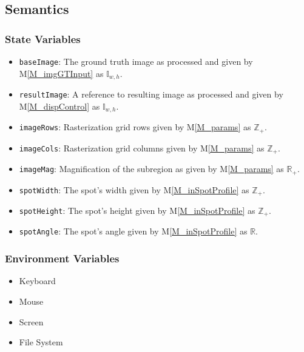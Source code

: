 \documentclass[12pt, titlepage]{article}
\newcommand{\mref}[1]{M\ref{#1}}
\newcommand{\code}[1]{\texttt{#1}}
\begin{document}
\subsection{Semantics}

\subsubsection{State Variables}
\begin{itemize}
  \item \code{baseImage}: The ground truth image as processed and given by \mref{M_imgGTInput} as $\mathbb{I}_{w,h}$.
  \item \code{resultImage}: A reference to resulting image as processed and given by \mref{M_dispControl} as $\mathbb{I}_{w,h}$.
  \item \code{imageRows}: Rasterization grid rows given by \mref{M_params} as $\mathbb{Z}_+$.
  \item \code{imageCols}: Rasterization grid columns given by \mref{M_params} as $\mathbb{Z}_+$.
  \item \code{imageMag}: Magnification of the subregion as given by \mref{M_params} as $\mathbb{R}_+$.
  \item \code{spotWidth}: The spot's width given by \mref{M_inSpotProfile} as $\mathbb{Z}_+$.
  \item \code{spotHeight}: The spot's height given by \mref{M_inSpotProfile} as $\mathbb{Z}_+$.
  \item \code{spotAngle}: The spot's angle given by \mref{M_inSpotProfile} as $\mathbb{R}$.
\end{itemize}

\subsubsection{Environment Variables}
\begin{itemize}
  \item Keyboard
  \item Mouse
  \item Screen
  \item File System
\end{itemize}
\end{document}
